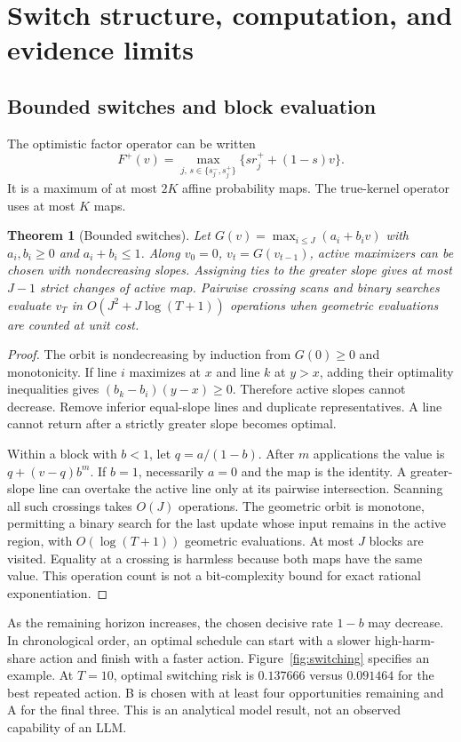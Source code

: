 \documentclass[10pt]{article}
\newtheorem{theorem}{Theorem}
\begin{document}
\section{Switch structure, computation, and evidence limits}
\subsection{Bounded switches and block evaluation}
The optimistic factor operator can be written
\begin{equation}
F^+(v)=\max_{j,\,s\in\{s_j^-,s_j^+\}}\{s r_j^+ +(1-s)v\}.\label{eq:affine}
\end{equation}
It is a maximum of at most $2K$ affine probability maps. The true-kernel operator uses at most $K$ maps.

\begin{theorem}[Bounded switches]\label{thm:switch}
Let $G(v)=\max_{i\leq J}(a_i+b_iv)$ with $a_i,b_i\geq0$ and $a_i+b_i\leq1$. Along $v_0=0$, $v_t=G(v_{t-1})$, active maximizers can be chosen with nondecreasing slopes. Assigning ties to the greater slope gives at most $J-1$ strict changes of active map. Pairwise crossing scans and binary searches evaluate $v_T$ in $O(J^2+J\log(T+1))$ operations when geometric evaluations are counted at unit cost.
\end{theorem}
\begin{proof}
The orbit is nondecreasing by induction from $G(0)\geq0$ and monotonicity. If line $i$ maximizes at $x$ and line $k$ at $y>x$, adding their optimality inequalities gives $(b_k-b_i)(y-x)\geq0$. Therefore active slopes cannot decrease. Remove inferior equal-slope lines and duplicate representatives. A line cannot return after a strictly greater slope becomes optimal.

Within a block with $b<1$, let $q=a/(1-b)$. After $m$ applications the value is $q+(v-q)b^m$. If $b=1$, necessarily $a=0$ and the map is the identity. A greater-slope line can overtake the active line only at its pairwise intersection. Scanning all such crossings takes $O(J)$ operations. The geometric orbit is monotone, permitting a binary search for the last update whose input remains in the active region, with $O(\log(T+1))$ geometric evaluations. At most $J$ blocks are visited. Equality at a crossing is harmless because both maps have the same value. This operation count is not a bit-complexity bound for exact rational exponentiation.
\end{proof}

As the remaining horizon increases, the chosen decisive rate $1-b$ may decrease. In chronological order, an optimal schedule can start with a slower high-harm-share action and finish with a faster action. Figure~\ref{fig:switching} specifies an example. At $T=10$, optimal switching risk is $0.137666$ versus $0.091464$ for the best repeated action. B is chosen with at least four opportunities remaining and A for the final three. This is an analytical model result, not an observed capability of an LLM.
\end{document}
